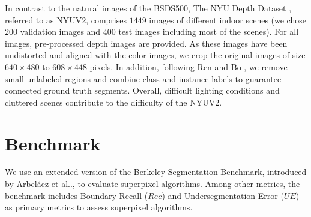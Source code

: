 \documentclass[runningheads]{llncs}
\makeatletter
\DeclareRobustCommand\onedot{\futurelet\@let@token\@onedot}
\def\@onedot{\ifx\@let@token.\else.\null\fi\xspace}
\def\etal{{et al}\onedot}
\makeatother
\begin{document}
    In contrast to the natural images of the BSDS500, The NYU Depth Dataset \cite{SilbermanHoiemKohliFergus:2012}, referred to as NYUV2, comprises $1449$ images of different indoor scenes (we chose $200$ validation images and $400$ test images including most of the scenes). For all images, pre-processed depth images are provided. As these images have been undistorted and aligned with the color images, we crop the original images of size $640 \times 480$ to $608 \times 448$ pixels. In addition, following Ren and Bo \cite{RenBo:2012},
    we remove small unlabeled regions and combine class and instance labels to guarantee connected ground truth segments. Overall, difficult lighting conditions and cluttered scenes contribute to the difficulty of the NYUV2.
    
    
    \vspace{-1mm}
    \section{Benchmark}
    \vspace{-0.5mm}
    \label{sec:benchmark}
    
    We use an extended version of the Berkeley Segmentation Benchmark, introduced by Arbel\'aez \etal \cite{ArbelaezMaireFowlkesMalik:2011}, to evaluate superpixel algorithms. Among other metrics, the benchmark includes Boundary Recall ($Rec$) and Undersegmentation Error ($UE$) \cite{LevinshteinStereKutulakosFleetDickinsonSiddiqi:2009,NeubertProtzel:2012} as primary metrics to assess superpixel algorithms. 
    
\end{document}
